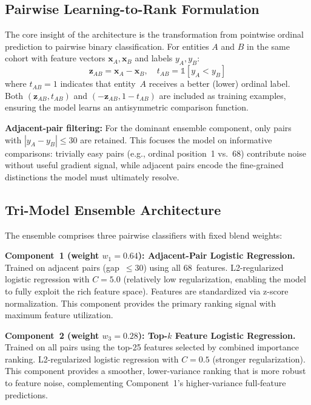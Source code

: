 \documentclass[conference]{IEEEtran}
\begin{document}
\subsection{Pairwise Learning-to-Rank Formulation}

The core insight of the architecture is the transformation from pointwise ordinal prediction to pairwise binary classification. For entities $A$ and $B$ in the same cohort with feature vectors $\mathbf{x}_A, \mathbf{x}_B$ and labels $y_A, y_B$:
\begin{equation}
\mathbf{z}_{AB} = \mathbf{x}_A - \mathbf{x}_B, \quad t_{AB} = \mathbb{1}[y_A < y_B]
\label{eq:pairwise}
\end{equation}
where $t_{AB} = 1$ indicates that entity~$A$ receives a better (lower) ordinal label. Both $(\mathbf{z}_{AB}, t_{AB})$ and $(-\mathbf{z}_{AB}, 1 - t_{AB})$ are included as training examples, ensuring the model learns an antisymmetric comparison function.

\textbf{Adjacent-pair filtering:} For the dominant ensemble component, only pairs with $|y_A - y_B| \leq 30$ are retained. This focuses the model on informative comparisons: trivially easy pairs (e.g., ordinal position~1 vs.\ 68) contribute noise without useful gradient signal, while adjacent pairs encode the fine-grained distinctions the model must ultimately resolve.

\subsection{Tri-Model Ensemble Architecture}

The ensemble comprises three pairwise classifiers with fixed blend weights:

\textbf{Component~1 (weight $w_1 = 0.64$): Adjacent-Pair Logistic Regression.}
Trained on adjacent pairs (gap~$\leq 30$) using all 68~features. L2-regularized logistic regression with $C = 5.0$ (relatively low regularization, enabling the model to fully exploit the rich feature space). Features are standardized via z-score normalization. This component provides the primary ranking signal with maximum feature utilization.

\textbf{Component~2 (weight $w_3 = 0.28$): Top-$k$ Feature Logistic Regression.}
Trained on all pairs using the top-25 features selected by combined importance ranking. L2-regularized logistic regression with $C = 0.5$ (stronger regularization). This component provides a smoother, lower-variance ranking that is more robust to feature noise, complementing Component~1's higher-variance full-feature predictions.
\end{document}
